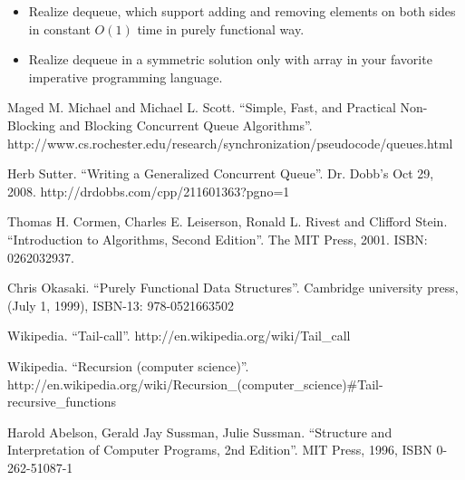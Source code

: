 \documentclass{article}
\begin{document}
\begin{Exercise}
\begin{itemize}
\item Realize dequeue, which support adding and removing elements on both sides in
constant $O(1)$ time in purely functional way.
\item Realize dequeue in a symmetric solution only with array in your
favorite imperative programming language.
\end{itemize}
\end{Exercise}


\begin{thebibliography}{99}

Maged M. Michael and Michael L. Scott. ``Simple, Fast, and Practical Non-Blocking and Blocking Concurrent Queue Algorithms''. http://www.cs.rochester.edu/research/synchronization/pseudocode/queues.html

Herb Sutter. ``Writing a Generalized Concurrent Queue''. Dr. Dobb's Oct 29, 2008. http://drdobbs.com/cpp/211601363?pgno=1

Thomas H. Cormen, Charles E. Leiserson, Ronald L. Rivest and Clifford Stein. ``Introduction to Algorithms, Second Edition''. The MIT Press, 2001. ISBN: 0262032937.

Chris Okasaki. ``Purely Functional Data Structures''. Cambridge university press, (July 1, 1999), ISBN-13: 978-0521663502

Wikipedia. ``Tail-call''. http://en.wikipedia.org/wiki/Tail\_call

Wikipedia. ``Recursion (computer science)''. http://en.wikipedia.org/wiki/Recursion\_(computer\_science)\#Tail-recursive\_functions

Harold Abelson, Gerald Jay Sussman, Julie Sussman. ``Structure and Interpretation of Computer Programs, 2nd Edition''. MIT Press, 1996, ISBN 0-262-51087-1

\end{thebibliography}

\ifx\wholebook\relax \else
\end{document}
